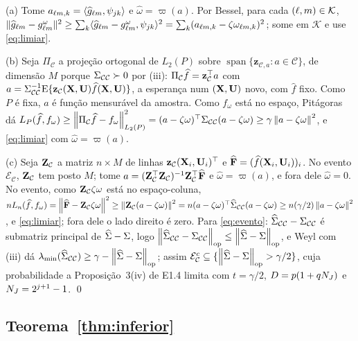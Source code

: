 \documentclass[11pt,a4paper]{article}
\newcommand{\lmin}{\lambda_{\min}}
\newcommand{\opnorm}[1]{\left\lVert #1 \right\rVert_{\mathrm{op}}}
\newcommand{\Kcal}{\mathcal{K}}
\newcommand{\Ccal}{\mathcal{C}}
\newcommand{\bz}{\mathbf{z}}
\newcommand{\ECc}{\mathcal{E}_{\mathcal{C}}}
\begin{document}
(a) Tome $a_{\ell m,k} = \langle \widehat g_{\ell m}, \psi_{jk} \rangle$ e
$\widehat\omega = \varpi(a)$. Por Bessel, para cada $(\cv,\md) \in \Kcal$,
$\lVert\widehat g_{\ell m} - g_{\ell m}^{\omega}\rVert^{2} \ge
\sum_{k}\langle \widehat g_{\ell m} - g_{\ell m}^{\omega}, \psi_{jk} \rangle^{2}
= \sum_{k}(a_{\ell m,k} - \zeta\omega_{\ell m,k})^{2}$; some em
$\Kcal$ e use \eqref{eq:limiar}.

(b) Seja $\Pi_{\Ccal}$ a projeção ortogonal de $L_{2}(P)$ sobre
$\operatorname{span}\{\bz_{\Ccal,a} : a \in \Ccal\}$, de dimensão $M$ porque
$\Gram_{\Ccal\Ccal} \succ 0$ por (iii): $\Pi_{\Ccal}\widehat f =
\bz_{\Ccal}\T a$ com $a = \Gram_{\Ccal\Ccal}^{-1}\E\{\bz_{\Ccal}(\bX,\bU)
\widehat f(\bX,\bU)\}$, a esperança num $(\mathbf{X},\mathbf{U})$ novo, com $\widehat f$
fixo. Como $P$ é fixa, $a$ é função mensurável da amostra. Como
$f_{\omega}$ está no espaço, Pitágoras dá $L_{P}(\widehat f,f_{\omega}) \ge
\normL{\Pi_{\Ccal}\widehat f - f_{\omega}}^{2} = (a -
\zeta\omega)\T\Gram_{\Ccal\Ccal}(a - \zeta\omega) \ge \gamma\norm{a -
\zeta\omega}^{2}$, e \eqref{eq:limiar} com $\widehat\omega = \varpi(a)$.

(c) Seja $\bZ_{\Ccal}$ a matriz $n\times M$ de linhas
$\bz_{\Ccal}(\bX_{i},\bU_{i})\T$ e $\widehat{\mathbf{F}} = (\widehat
f(\mathbf{X}_{i},\mathbf{U}_{i}))_{i}$. No evento $\ECc$, $\bZ_{\Ccal}$ tem posto $M$; tome
$a = (\bZ_{\Ccal}\T\bZ_{\Ccal})^{-1}\bZ_{\Ccal}\T\widehat{\mathbf{F}}$ e
$\widehat\omega = \varpi(a)$, e fora dele $\widehat\omega = 0$. No evento,
como $\bZ_{\Ccal}\zeta\omega$ está no espaço-coluna,
$nL_{n}(\widehat f,f_{\omega}) = \norm{\widehat{\mathbf{F}} -
\bZ_{\Ccal}\zeta\omega}^{2} \ge \norm{\bZ_{\Ccal}(a - \zeta\omega)}^{2} = n(a -
\zeta\omega)\T\Gramhat_{\Ccal\Ccal}(a - \zeta\omega) \ge
n(\gamma/2)\norm{a - \zeta\omega}^{2}$, e \eqref{eq:limiar}; fora dele o lado
direito é zero. Para \eqref{eq:evento}: $\Gramhat_{\Ccal\Ccal} -
\Gram_{\Ccal\Ccal}$ é submatriz principal de $\widehat{\Sigma} - \Sigma$, logo
$\opnorm{\Gramhat_{\Ccal\Ccal} - \Gram_{\Ccal\Ccal}} \le \opnorm{\Gramhat -
\Gram}$, e Weyl com (iii) dá $\lmin(\Gramhat_{\Ccal\Ccal}) \ge \gamma -
\opnorm{\Gramhat - \Gram}$; assim $\ECc^{c} \subseteq \{\opnorm{\Gramhat -
\Gram} > \gamma/2\}$, cuja probabilidade a Proposição~3(iv) de E1.4 limita
com $t = \gamma/2$, $D = p(1 + qN_{J})$ e $N_{J} = 2^{j+1} - 1$. \qed

\subsection*{Teorema~\ref{thm:inferior}}
\end{document}
